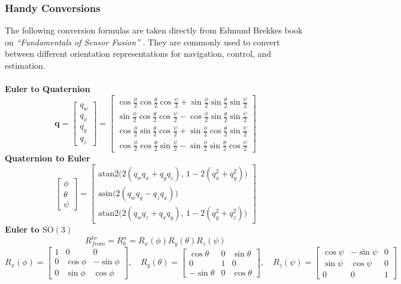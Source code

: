 \subsubsection{Handy Conversions}
The following conversion formulas are taken directly from Edmund Brekkes book on \textit{``Fundamentals of Sensor Fusion''} \cite{sensor_fusion_book}. They are commonly used to convert between different orientation representations for navigation, control, and estimation.
\\ \\
\textbf{Euler to Quaternion}
$$
    \mathbf{q} =
    \begin{bmatrix}
        q_w \\ q_x \\ q_y \\ q_z
    \end{bmatrix}
    =
    \begin{bmatrix}
        \cos\frac{\phi}{2}\cos\frac{\theta}{2}\cos\frac{\psi}{2} + \sin\frac{\phi}{2}\sin\frac{\theta}{2}\sin\frac{\psi}{2} \\
        \sin\frac{\phi}{2}\cos\frac{\theta}{2}\cos\frac{\psi}{2} - \cos\frac{\phi}{2}\sin\frac{\theta}{2}\sin\frac{\psi}{2} \\
        \cos\frac{\phi}{2}\sin\frac{\theta}{2}\cos\frac{\psi}{2} + \sin\frac{\phi}{2}\cos\frac{\theta}{2}\sin\frac{\psi}{2} \\
        \cos\frac{\phi}{2}\cos\frac{\theta}{2}\sin\frac{\psi}{2} - \sin\frac{\phi}{2}\sin\frac{\theta}{2}\cos\frac{\psi}{2}
    \end{bmatrix}
$$
\textbf{Quaternion to Euler}
$$
    \begin{bmatrix}
        \phi \\ \theta \\ \psi
    \end{bmatrix}
    =
    \begin{bmatrix}
        \text{atan2}\big(2(q_w q_x + q_y q_z),\, 1 - 2(q_x^2 + q_y^2)\big) \\
        \text{asin}\big(2(q_w q_y - q_z q_x)\big) \\
        \text{atan2}\big(2(q_w q_z + q_x q_y),\, 1 - 2(q_y^2 + q_z^2)\big)
    \end{bmatrix}
$$
\textbf{Euler to $\mathrm{SO}(3)$}
$$
    R_{from}^{to} = R_{b}^{n} = R_x(\phi) R_y(\theta) R_z(\psi)
$$
$$
    R_x(\phi) =
    \begin{bmatrix}
        1 & 0 & 0 \\
        0 & \cos\phi & -\sin\phi \\
        0 & \sin\phi & \cos\phi
    \end{bmatrix}, \quad
    R_y(\theta) =
    \begin{bmatrix}
        \cos\theta & 0 & \sin\theta \\
        0 & 1 & 0 \\
        -\sin\theta & 0 & \cos\theta
    \end{bmatrix}, \quad
    R_z(\psi) =
    \begin{bmatrix}
        \cos\psi & -\sin\psi & 0 \\
        \sin\psi & \cos\psi & 0 \\
        0 & 0 & 1
    \end{bmatrix}
$$
